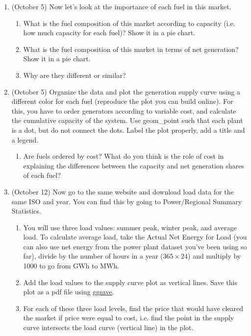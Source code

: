 \documentclass[11pt]{article}
\begin{document}
\begin{enumerate}
	\item (October 5) Now let's look at the importance of each fuel in this market. 
		\begin{enumerate}
		\item What is the fuel composition of this market according to capacity (i.e. how much capacity for each fuel)? Show it in a pie chart.
		\item What is the fuel composition of this market in terms of net generation? Show it in a pie chart.
		\item Why are they different or similar?
		\end{enumerate}

\item (October 5) Organize the data and plot the generation supply curve using a different color for each fuel (reproduce the plot you can build online). For this, you have to order generators according to variable cost, and calculate the cumulative capacity of the system. Use geom\_point such that each plant is a dot, but do not connect the dots. Label the plot properly, add a title and a legend.
	\begin{enumerate}
	\item Are fuels ordered by cost? What do you think is the role of cost in explaining the differences between the capacity and net generation shares of each fuel?
	\end{enumerate}
	
\item (October 12) Now go to the same website and download load data for the same ISO and year. You can find this by going to Power/Regional Summary Statistics.
	\begin{enumerate}
	\item  You will use three load values: summer peak, winter peak, and average load. To calculate average load, take the Actual Net Energy for Load (you can also use net energy from the power plant dataset you've been using so far), divide by the number of hours in a year ($365\times24$) and multiply by 1000 to go from GWh to MWh.
	\item Add the load values to the supply curve plot as vertical lines. Save this plot as a pdf file using \href{https://ggplot2.tidyverse.org/reference/ggsave.html}{ggsave}.
	\item For each of these three load levels, find the price that would have cleared the market if price were equal to cost, i.e. find the point in the supply curve intersects the load curve (vertical line) in the plot.
	\end{enumerate}
	


\end{enumerate}
\end{document}
